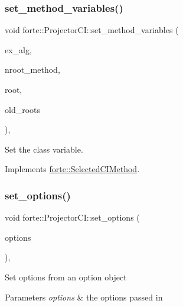 \subsubsection{\texorpdfstring{set\+\_\+method\+\_\+variables()}{set\_method\_variables()}}
{\footnotesize\ttfamily void forte\+::\+Projector\+C\+I\+::set\+\_\+method\+\_\+variables (\begin{DoxyParamCaption}\item[{std\+::string}]{ex\+\_\+alg,  }\item[{size\+\_\+t}]{nroot\+\_\+method,  }\item[{size\+\_\+t}]{root,  }\item[{const std\+::vector$<$ std\+::vector$<$ std\+::pair$<$ \mbox{\hyperlink{namespaceforte_a2076c63fd7b8732004d9e1442ce527c1}{Determinant}}, double $>$$>$$>$ \&}]{old\+\_\+roots }\end{DoxyParamCaption})\hspace{0.3cm}{\ttfamily [override]}, {\ttfamily [virtual]}}



Set the class variable. 



Implements \mbox{\hyperlink{classforte_1_1_selected_c_i_method_a37f95503d0241387195dc7d412fc6e78}{forte\+::\+Selected\+C\+I\+Method}}.

\mbox{\label{classforte_1_1_projector_c_i_af6605360f58baeccb1877dedcb2ff866}} 
\subsubsection{\texorpdfstring{set\+\_\+options()}{set\_options()}}
{\footnotesize\ttfamily void forte\+::\+Projector\+C\+I\+::set\+\_\+options (\begin{DoxyParamCaption}\item[{std\+::shared\+\_\+ptr$<$ \mbox{\hyperlink{classforte_1_1_forte_options}{Forte\+Options}} $>$}]{options }\end{DoxyParamCaption})\hspace{0.3cm}{\ttfamily [override]}, {\ttfamily [virtual]}}

Set options from an option object 
\begin{DoxyParams}{Parameters}
{\em options} & the options passed in \\
\hline
\end{DoxyParams}


